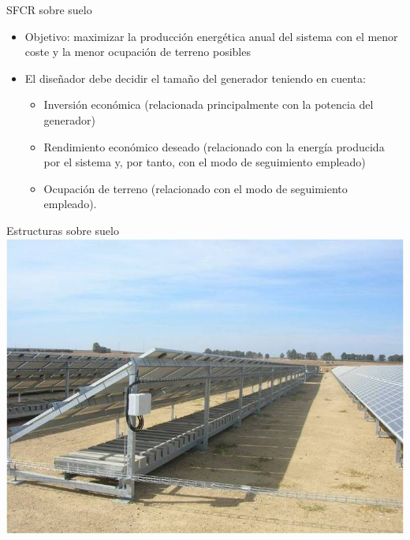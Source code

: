 \documentclass[xcolor={usenames,svgnames,dvipsnames}]{beamer}
\begin{document}
\begin{frame}[label=sec-1-0-6]{SFCR sobre suelo}
\begin{itemize}
\item \alert{Objetivo}: maximizar la producción energética anual del sistema con
el menor coste y la menor ocupación de terreno posibles

\item El diseñador debe decidir el tamaño del generador teniendo en cuenta:

\begin{itemize}
\item Inversión económica (relacionada principalmente con la potencia
del generador)

\item Rendimiento económico deseado (relacionado con la energía
producida por el sistema y, por tanto, con el modo de seguimiento
empleado)

\item Ocupación de terreno (relacionado con el modo de seguimiento
empleado).
\end{itemize}
\end{itemize}
\end{frame}


\begin{frame}[label=sec-1-0-7]{Estructuras sobre suelo}
\includegraphics[width=.9\linewidth]{../figs/EstructuraEstaticaSuelo.jpg}
\end{frame}
\end{document}
